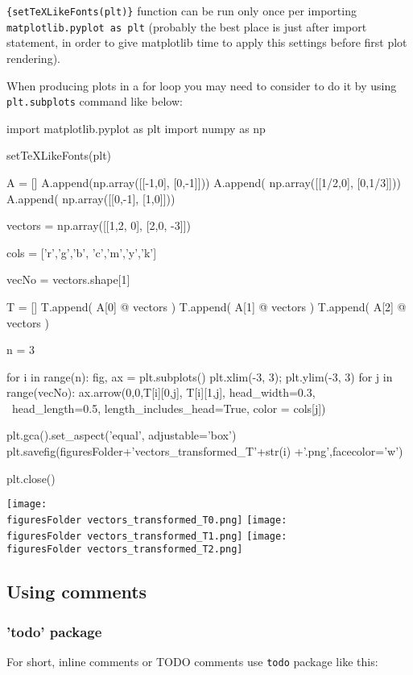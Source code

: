 \documentclass[11pt]{article}
\newcommand{\figuresFolder}{figures/}
\begin{document}
\verb|{setTeXLikeFonts(plt)}| function can be run only once per importing \verb|matplotlib.pyplot as plt| (probably the best place is just after import statement, in order to give matplotlib time to apply this settings before first plot rendering). 

When producing plots in a for loop you may need to consider to do it by using \verb|plt.subplots| command like below:

\begin{pyblock}
import matplotlib.pyplot as plt
import numpy as np

setTeXLikeFonts(plt)

A = []
A.append(np.array([[-1,0],
               [0,-1]]))
A.append( np.array([[1/2,0],
               [0,1/3]]))
A.append( np.array([[0,-1],
               [1,0]]))

vectors = np.array([[1,2,  0],
                    [2,0, -3]])

cols = ['r','g','b', 'c','m','y','k']

vecNo = vectors.shape[1]

T = []
T.append( A[0] @ vectors )
T.append( A[1] @ vectors )
T.append( A[2] @ vectors )

n = 3

for i in range(n):
    fig, ax = plt.subplots()    
    plt.xlim(-3, 3); plt.ylim(-3, 3) 
    for j in range(vecNo):
        ax.arrow(0,0,T[i][0,j], T[i][1,j], head_width=0.3, \
              head_length=0.5, length_includes_head=True, color = cols[j])

    plt.gca().set_aspect('equal', adjustable='box')
    plt.savefig(figuresFolder+'vectors_transformed_T'+str(i) +'.png',facecolor='w')
    
    plt.close()
    
\end{pyblock}

\texttt{[image: \\figuresFolder vectors\_transformed\_T0.png]}
\texttt{[image: \\figuresFolder vectors\_transformed\_T1.png]}
\texttt{[image: \\figuresFolder vectors\_transformed\_T2.png]}



\subsection{Using comments}

\subsubsection{'todo' package}
For short, inline comments or TODO comments use \verb|todo| package like this:
\MB{This is todo margin note}
\end{document}
